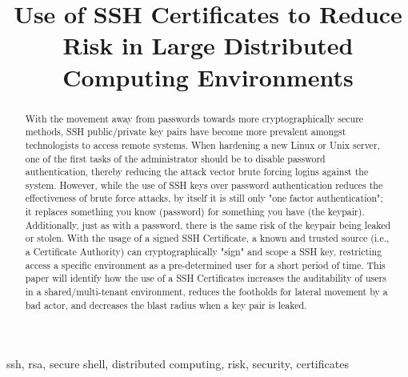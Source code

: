 \documentclass[conference]{IEEEtran}
\begin{document}
\title{Use of SSH Certificates to Reduce Risk in Large Distributed Computing Environments\\
}

\author{
}

\maketitle

\begin{abstract}
With the movement away from passwords towards more cryptographically secure methods, SSH public/private key pairs have become more prevalent amongst technologists to access remote systems. When hardening a new Linux or Unix server, one of the first tasks of the administrator should be to disable password authentication, thereby reducing the attack vector brute forcing logins against the system. However, while the use of SSH keys over password authentication reduces the effectiveness of brute force attacks, by itself it is still only "one factor authentication"; it replaces something you know (password) for something you have (the keypair). Additionally, just as with a password, there is the same risk of the keypair being leaked or stolen. With the usage of a signed SSH Certificate, a known and trusted source (i.e., a Certificate Authority) can cryptographically "sign" and scope a SSH key, restricting access a specific environment as a pre-determined user for a short period of time. This paper will identify how the use of a SSH Certificates increases the auditability of users in a shared/multi-tenant environment, reduces the footholds for lateral movement by a bad actor, and decreases the blast radius when a key pair is leaked.
\end{abstract}
\begin{IEEEkeywords}
ssh, rsa, secure shell, distributed computing, risk, security, certificates
\end{IEEEkeywords}
\end{document}
